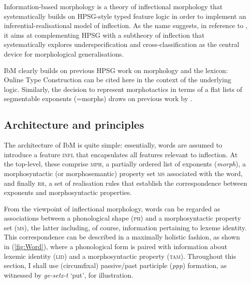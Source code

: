 \documentclass[output=paper
	        ,collection
	        ,collectionchapter
 	        ,biblatex
                ,babelshorthands
                ,newtxmath
                ,draftmode
                ,colorlinks, citecolor=brown
]{langscibook}
\begin{document}
\begin{exe}
\begin{xlist}
Information-based morphology \citep{Crysmann:Bonami:2016} is a theory
of inflectional morphology that systematically builds on HPSG-style
typed feature logic in order to implement an inferential-realisational
model of inflection. As the name suggests, in reference to
\citet{Pollard87}, it aims at complementing HPSG with a 
subtheory of inflection that systematically 
explores underspecification and cross-classification as the central
device for morphological generalisations.

IbM clearly builds on previous HPSG work on morphology and the
lexicon: Online Type Construction \citep{Koenig94} can be cited here
in the context of the underlying logic. Similarly, the decision to
represent morphotactics in terms of a flat lists of segmentable
exponents (=morphs) draws on previous work by
\citet{crysmann_b03book}. 


\subsection{Architecture and principles}

The architecture of IbM is quite simple: essentially, words are
assumed to introduce a feature \textsc{infl} that encapsulates all
features relevant to inflection. At the top-level, these comprise
\textsc{mph}, a partially ordered list of exponents (\textit{morph}),
a morphosyntactic (or morphosemantic) property set \textsc{ms}
associated with the word, and finally \textsc{rr}, a set  of
realisation rules that establish the correspondence between exponents
and morphosyntactic properties.   

\begin{exe}
  \ex
{}

\end{exe}

From the viewpoint of inflectional morphology, words can be regarded
as associations between a phonological shape (\textsc{ph}) and a
morphosyntactic property set (\textsc{ms}), the latter including, of
course, information pertaining to lexeme identity. This correspondence
can be described in a maximally holistic fashion, as shown in 
(\ref{fig:Word}), where a phonological form is paired with information
about lexemic identity (\textsc{lid}) and a morphosyntactic property (\textsc{tam}). Throughout this section, I shall use 
(circumfixal) passive/past participle (\emph{ppp}) formation, as
witnessed by \textit{ge-\emph{setz}-t} `put', for illustration.


\end{xlist}
\end{exe}
\end{document}
